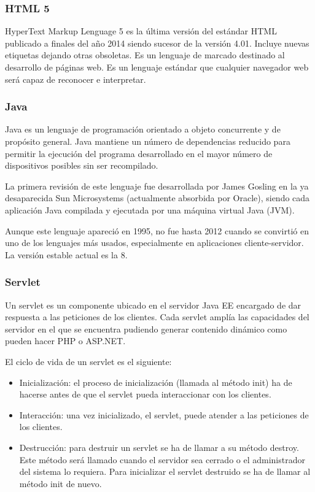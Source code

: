\subsubsection{HTML 5}
HyperText Markup Lenguage 5 es la última versión del estándar HTML publicado a finales del año 2014 siendo sucesor de la versión 4.01. Incluye nuevas etiquetas dejando otras obsoletas. Es un lenguaje de marcado destinado al desarrollo de páginas web. Es un lenguaje estándar que cualquier navegador web será capaz de reconocer e interpretar.

\subsubsection{Java}
Java es un lenguaje de programación orientado a objeto concurrente y de propósito general. Java mantiene un número de dependencias reducido para permitir la ejecución del programa desarrollado en el mayor número de dispositivos posibles sin ser recompilado.

La primera revisión de este lenguaje fue desarrollada por James Gosling en la ya desaparecida Sun Microsystems (actualmente absorbida por Oracle), siendo cada aplicación Java compilada y ejecutada por una máquina virtual Java (JVM).

Aunque este lenguaje apareció en 1995, no fue hasta 2012 cuando se convirtió en uno de los lenguajes más usados, especialmente en aplicaciones cliente-servidor. La versión estable actual es la 8.

\subsubsection{Servlet}

Un servlet es un componente ubicado en el servidor Java EE encargado de dar respuesta a las peticiones de los clientes. Cada servlet amplía las capacidades del servidor en el que se encuentra pudiendo generar contenido dinámico como pueden hacer PHP o ASP.NET.

El ciclo de vida de un servlet es el siguiente:

\begin{itemize}
	\item Inicialización: el proceso de inicialización (llamada al método init) ha de hacerse antes de que el servlet pueda interaccionar con los clientes.
	\item Interacción: una vez inicializado, el servlet, puede atender a las peticiones de los clientes.
	\item Destrucción: para destruir un servlet se ha de llamar a su método destroy. Este método será llamado cuando el servidor sea cerrado o el administrador del sistema lo requiera. Para inicializar el servlet destruido se ha de llamar al método init de nuevo.
\end{itemize}

